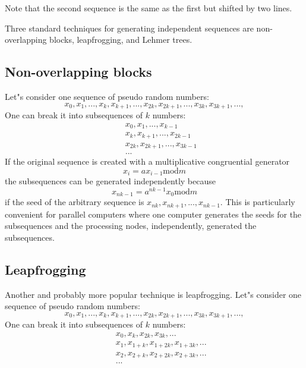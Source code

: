 \documentclass[justified, sixbynine]{tufte-book}
\theoremstyle{plain}%
\newtheorem * {corollary}{Corollary}
\theoremstyle{definition}
\theoremstyle{remark}
\newtheorem * {remark}{Remark}
\newtheorem * {note}{Note}
\begin{document}
\begin{fullwidth}
Note that the second sequence is the same as the first but shifted by two
lines.

Three standard techniques for generating independent sequences are
non-overlapping blocks, leapfrogging, and Lehmer trees.

\goodbreak\subsection{Non-overlapping blocks}

Let"s consider one sequence of pseudo random numbers:
\begin{equation}
x_0, x_1, ..., x_k, x_{k+1}, ..., x_{2k}, x_{2k+1}, ..., x_{3k}, x_{3k+1}, ..., 
\end{equation}
One can break it into subsequences of $k$ numbers:
\begin{eqnarray}
&&x_0, x_1, ..., x_{k-1} \\
&&x_k, x_{k+1}, ..., x_{2k-1} \\
&&x_{2k}, x_{2k+1}, ..., x_{3k-1} \\
&&...
\end{eqnarray}
If the original sequence is created with a multiplicative congruential
generator
\begin{equation}
x_i=ax_{i-1}\textrm{mod}m
\end{equation}
the subsequences can be generated independently because
\begin{equation}
x_{nk-1}=a^{nk-1}x_0\textrm{mod}m
\end{equation}
if the seed of the arbitrary sequence is $x_{nk}, x_{nk+1}, ..., x_{nk-1}$. This
is particularly convenient for parallel computers where one computer
generates the seeds for the subsequences and the processing nodes, 
independently, generated the subsequences.

\goodbreak\subsection{Leapfrogging}

Another and probably more popular technique is leapfrogging.
Let"s consider one sequence of pseudo random numbers:
\begin{equation}
x_0, x_1, ..., x_k, x_{k+1}, ..., x_{2k}, x_{2k+1}, ..., x_{3k}, x_{3k+1}, ..., 
\end{equation}
One can break it into subsequences of $k$ numbers:
\begin{eqnarray}
&&x_0, x_k, x_{2k}, x_{3k}, ... \\
&&x_1, x_{1+k}, x_{1+2k}, x_{1+3k}, ... \\
&&x_2, x_{2+k}, x_{2+2k}, x_{2+3k}, ... \\
&&...
\end{eqnarray}


\end{fullwidth}
\end{document}
